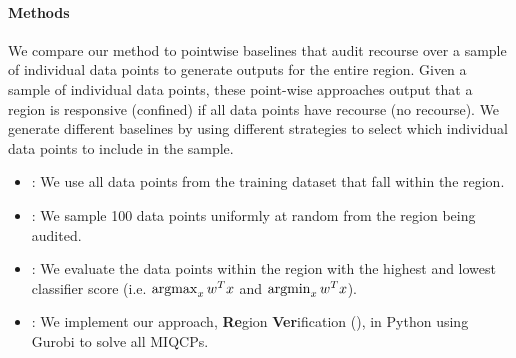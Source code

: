 \paragraph{Methods} We compare our method to pointwise baselines that audit recourse over a sample of individual data points to generate outputs for the entire region. Given a sample of individual data points, these point-wise approaches output that a region is responsive (confined) if all data points have recourse (no recourse). We generate different baselines by using different strategies to select which individual data points to include in the sample.
\begin{itemize}[leftmargin=*, itemsep=0pt]
    \item {}: We use all data points from the training dataset that fall within the region.
    \item {}: We sample 100 data points uniformly at random from the region being audited.
    \item {}: We evaluate the data points within the region with the highest and lowest classifier score (i.e. $\operatorname*{argmax}_{x} w^T x$ and  $\operatorname*{argmin}_{x} w^T x$). %
    \item \us{}: We implement our approach, \textbf{Re}gion \textbf{Ver}ification (\us{}), in Python using Gurobi \cite{achterberg2019gurobi} to solve all MIQCPs. 
\end{itemize} 






